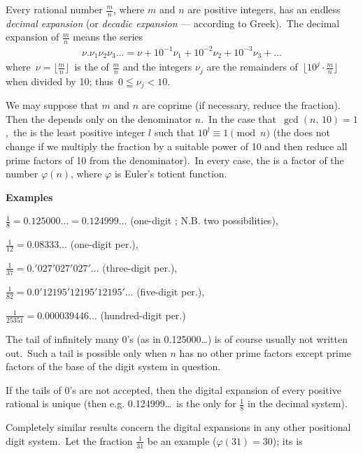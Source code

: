 \documentclass[12pt]{article}
\begin{document}
Every rational number $\frac{m}{n}$, where $m$ and $n$ are positive integers, has an endless  {\em decimal expansion} (or {\em decadic expansion} --- according to Greek).\, The decimal expansion of $\frac{m}{n}$ means the series 
\begin{align}
  \nu.\nu_1\nu_2\nu_3\ldots = \nu+10^{-1}\nu_1+10^{-2}\nu_2+10^{-3}\nu_3+\ldots
\end{align}
where \,$\nu = \lfloor\frac{m}{n}\rfloor$\, is the  of $\frac{m}{n}$ and the integers $\nu_j$ are the remainders of\, $\lfloor 10^j\cdot\!\frac{m}{n}\rfloor$\, when divided by 10; thus\, $0 \leqq \nu_j < 10$.

We may suppose that $m$ and $n$ are coprime (if necessary, reduce the fraction).\, Then the  depends only on the denominator $n$.\, In the case that\, $\gcd(n,\,10) = 1$,\, the  is the least positive integer $l$ such that $10^l\equiv 1 \pmod{n}$ (the  does not change if we multiply the fraction by a suitable power of 10 and then reduce all prime factors of 10 from the denominator).\, In every case, the  is a factor of the number $\varphi(n)$, where $\varphi$ is Euler's totient function.

\textbf{Examples}

$\frac{1}{8} = 0.125000\ldots = 0.124999\ldots$ (one-digit ;  N.B. two possibilities),

$\frac{1}{12} = 0.08333\ldots$ (one-digit per.),

$\frac{1}{37} = 0.'027'027'027'\ldots$ (three-digit per.),

$\frac{1}{82} = 0.0'12195'12195'12195'\ldots$ (five-digit per.), 

$\frac{1}{25351} = 0.000039446\ldots$ (hundred-digit per.)

The tail of infinitely many 0's (as in 0.125000\ldots) is of course usually not written out.\, Such a tail is possible only when $n$ has no other prime factors except prime factors of the base of the digit system in question. 

If the tails of 0's are not accepted, then the digital expansion of every positive rational is unique (then e.g. 0.124999\ldots\, is the only  for $\frac{1}{8}$ in the decimal system).

Completely similar results concern the digital expansions in any other positional digit system.\, Let the fraction $\frac{1}{31}$ be an example ($\varphi(31) = 30$); its  is
\end{document}
